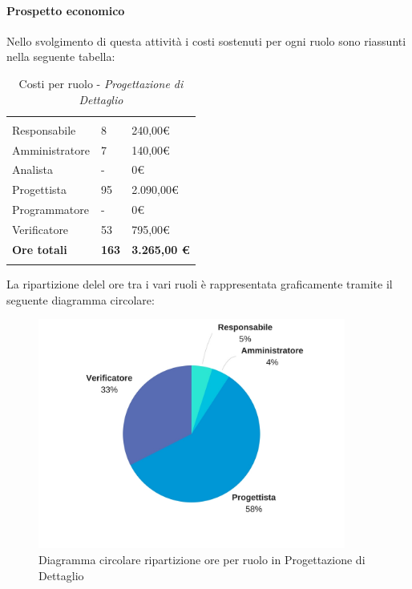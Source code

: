 			\paragraph{Prospetto economico} \Spazio
			Nello svolgimento di questa attività i costi sostenuti per ogni ruolo sono riassunti nella seguente tabella:
			\begin{table}[H]
			\centering
			\begin{tabular}{p{4cm}|C{4cm}|C{4cm}}
				
				 & &\\
				Responsabile & 8 & 240,00\euro \\
				\hline
				Amministratore& 7 & 140,00\euro \\
				\hline
				Analista & - & 0\euro \\
				\hline
				Progettista & 95 & 2.090,00\euro \\
				\hline
				Programmatore & - & 0\euro \\
				\hline
				Verificatore & 53 & 795,00\euro \\
				\hline
				\textbf{Ore totali} & \textbf{163} & \textbf{3.265,00 \euro} \\
			\end{tabular}
			\caption{Costi per ruolo - \textit{Progettazione di Dettaglio}}
		\end{table}
		
		La ripartizione delel ore tra i vari ruoli è rappresentata graficamente tramite il seguente diagramma circolare:
		
		\begin{figure}[h] 
			\centering 
			\includegraphics[width=0.9\textwidth]{images/CircolareProgettazioneDiDettaglio.jpg} 
			\caption{Diagramma circolare ripartizione ore per ruolo in Progettazione di Dettaglio}
			\label{CircolareProgettazioneDiDettaglio}
		\end{figure}		
		
